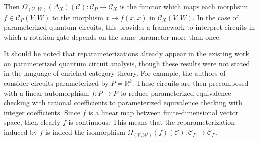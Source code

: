 \begin{exa}
\begin{itemize}
          Then $\Omega_{(\mathcal{V},\mathcal{W})}(\Delta_X )( \mathcal{C} ): \mathcal{C}_P \to \mathcal{C}_X$ is the functor which maps each morphsim $f \in \mathcal{C}_P( V, W )$ to the morphism $x \mapsto f( x, x )$ in $\mathcal{C}_X( V, W )$.
          In the case of parameterized quantum circuits, this provides a framework to interpret circuits in which a rotation gate depends on the same parameter more than once.
    \end{itemize}
    It should be noted that reparameterizations already appear in the existing work on parameterized quantum circuit analysis, though these results were not stated in the language of enriched category theory.
    For example, the authors of~\cite{RossWesley2025} consider circuits parameterized by $P = \mathbb{R}^k$.
    These circuits are then precomposed with a linear automorphism $f: P \to P$ to reduce parameterized equivalence checking with rational coefficients to parameterized equivalence checking with integer coefficients.
    Since $f$ is a linear map between finite-dimensional vector space, then clearly $f$ is continuous.
    This means that the reparameterization induced by $f$ is indeed the isomorphism $\Omega_{(\mathcal{V},\mathcal{W})}( f )( \mathcal{C} ): \mathcal{C}_P \to \mathcal{C}_P$.
\end{exa}

